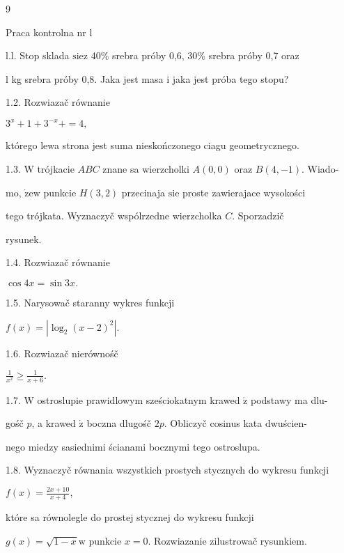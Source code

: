 \documentclass[a4paper,12pt]{article}
\begin{document}
9

Praca kontrolna nr l

l.l. Stop sklada $\mathrm{s}\mathrm{i}\mathrm{e} \mathrm{z}$ 40\% srebra próby 0,6, 30\% srebra próby 0,7 oraz

l kg srebra próby 0,8. Jaka jest masa $\mathrm{i}$ jaka jest próba tego stopu?

1.2. Rozwiazač równanie

$3^{x}+1+3^{-x}+=4,$

którego lewa strona jest suma nieskończonego ciagu geometrycznego.

1.3. $\mathrm{W}$ trójkacie $ABC$ znane sa wierzcholki $A(0,0)$ oraz $B(4,-1)$. Wiado-

mo, $\dot{\mathrm{z}}\mathrm{e}\mathrm{w}$ punkcie $H(3,2)$ przecinaja $\mathrm{s}\mathrm{i}\mathrm{e}$ proste zawierajace wysokości

tego trójkata. Wyznaczyč wspólrzedne wierzcholka $C$. Sporzadzič

rysunek.

1.4. Rozwiazač równanie

$\cos 4x=\sin 3x.$

1.5. Narysowač staranny wykres funkcji

$f(x)=|\log_{2}(x-2)^{2}|.$

1.6. Rozwiazač nierównośč

$\displaystyle \frac{1}{x^{2}}\geq\frac{1}{x+6}.$

1.7. $\mathrm{W}$ ostroslupie prawidlowym sześciokatnym krawed $\acute{\mathrm{z}}$ podstawy ma dlu-

gośč $p$, a krawed $\acute{\mathrm{z}}$ boczna dlugośč $2p$. Obliczyč cosinus kata dwuścien-

nego miedzy sasiednimi ścianami bocznymi tego ostroslupa.

1.8. Wyznaczyč równania wszystkich prostych stycznych do wykresu funkcji

$f(x)=\displaystyle \frac{2x+10}{x+4},$

które sa równolegle do prostej stycznej do wykresu funkcji

$g(x)=\sqrt{1-x}\mathrm{w}$ punkcie $x=0$. Rozwiazanie zilustrowač rysunkiem.
\end{document}
